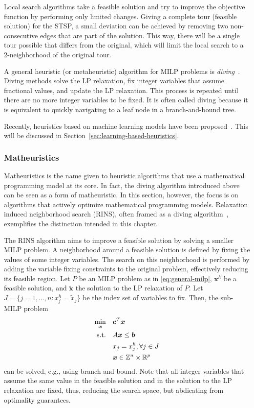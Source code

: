 Local search algorithms take a feasible solution and try to improve the objective function by performing only limited changes.
Giving a complete tour (feasible solution) for the STSP, a small deviation can be achieved by removing two non-consecutive edges that are part of the solution.
This way, there will be a single tour possible that differs from the original, which will limit the local search to a 2-neighborhood of the original tour.

A general heuristic (or metaheuristic) algorithm for MILP problems is \emph{diving}~\cite{fischettiHeuristicsMixedInteger2011}.
Diving methods solve the LP relaxation, fix integer variables that assume fractional values, and update the LP relaxation.
This process is repeated until there are no more integer variables to be fixed.
It is often called diving because it is equivalent to quickly navigating to a leaf node in a branch-and-bound tree.

Recently, heuristics based on machine learning models have been proposed~\cite{bengioMachineLearningCombinatorial2021}.
This will be discussed in Section~\ref{sec:learning-based-heuristics}.

\subsubsection{Matheuristics}

Matheuristics is the name given to heuristic algorithms that use a mathematical programming model at its core.
In fact, the diving algorithm introduced above can be seen as a form of matheuristic.
In this section, however, the focus is on algorithms that actively optimize mathematical programming models.
Relaxation induced neighborhood search (RINS), often framed as a diving algorithm~\cite{maniezzoMatheuristicsAlgorithmsImplementations2021}, exemplifies the distinction intended in this chapter.

The RINS algorithm aims to improve a feasible solution by solving a smaller MILP problem. 
A neighborhood around a feasible solution is defined by fixing the values of some integer variables.
The search on this neighborhood is performed by adding the variable fixing constraints to the original problem, effectively reducing its feasible region.
Let $P$ be an MILP problem as in \eqref{eq:general-milp}, $\bm{x}^{h}$ be a feasible solution, and $\widetilde{\bm{x}}$ the solution to the LP relaxation of $P$.
Let $J = \{j = 1,\ldots,n : x_j^{h} = \widetilde{x}_j\}$ be the index set of variables to fix.
Then, the sub-MILP problem
\begin{align*}
    \min_{\bm{x}} \quad & \bm{c}^{T}\bm{x} \\
    \textrm{s.t.} \quad & A\bm{x}\le \bm{b} \\
      & x_j = x_j^{h}, \forall j \in J \\
      & \bm{x}\in \mathbb{Z}^{n}\times \mathbb{R}^{p}
\end{align*}
can be solved, e.g., using branch-and-bound.
Note that all integer variables that assume the same value in the feasible solution and in the solution to the LP relaxation are fixed, thus, reducing the search space, but abdicating from optimality guarantees.

